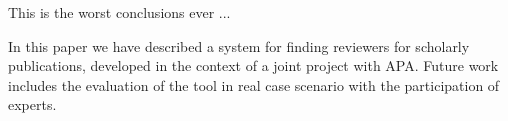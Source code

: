 This is the worst conclusions ever ...

In this paper we have described a system for finding reviewers for scholarly publications, developed in the context of a joint project with APA. Future work includes the evaluation of the tool in real case scenario with the participation of experts. 
